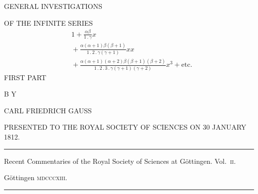 \clearpage{}\thispagestyle{empty}
\begin{center}
GENERAL INVESTIGATIONS

\medskip
OF THE INFINITE SERIES
\[
\begin{aligned}&1+\frac{\alpha\beta}{1\mathbin{.}\gamma}x\\
&{}+\frac{\alpha(\alpha+1)\beta(\beta+1)}{1\mathbin{.}2\mathbin{.}\gamma(\gamma+1)}xx\\
&{}+\frac{\alpha(\alpha+1)(\alpha+2)\beta(\beta+1)(\beta+2)}{1\mathbin{.}2\mathbin{.}3\mathbin{.}\gamma(\gamma+1)(\gamma+2)}x^3+\mathrm{etc.}
\end{aligned}
\]
\bigskip
FIRST PART

\bigskip
B Y

\bigskip
CARL FRIEDRICH GAUSS

\bigskip
PRESENTED TO THE ROYAL SOCIETY OF SCIENCES ON 30 JANUARY 1812.

\bigskip
\rule{0.7\linewidth}{0.4pt}

Recent Commentaries of the Royal Society of Sciences at Göttingen. Vol.~\textsc{ii}.

Göttingen \textsc{mdcccxiii}.

\rule{0.7\linewidth}{0.4pt}
\end{center}
